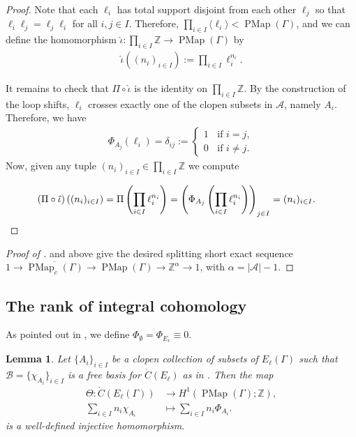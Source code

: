 \documentclass[11pt]{amsart}
\theoremstyle{plain}
\newtheorem{LEM}[THM]{Lemma}
\theoremstyle{definition}
\DeclareMathOperator{\PMap}{PMap}
\newcommand{\Z}{\mathbb{Z}}
\newcommand{\cA}{\mathcal{A}}
\def\G{{\Gamma}}
\newcommand{\la}{\langle}
\newcommand{\ra}{\rangle}
\newcommand{\<}{\langle}
\renewcommand{\>}{\rangle}
\newcommand{\dC}{\mathring{C}}
\begin{document}
\begin{proof}
    Note that each $\ell_{i}$ has total support disjoint from each other $\ell_{j}$ so that $\ell_{i}\ell_{j} = \ell_{j}\ell_{i}$ for all $i,j \in I$. Therefore, $\prod_{i \in I} \la \ell_{i} \ra < \PMap(\G)$, and we can define the homomorphism $\hat{\iota}: \prod_{i \in I}\mathbb{Z} \to \PMap(\G)$ by 
    \begin{align*}
        \hat{\iota}\left((n_{i})_{i\in I}\right) := \prod_{i\in I} \ell_{i}^{n_{i}}.
    \end{align*}
    
    
    It remains to check that $\Pi \circ \hat{\iota}$ is the identity on $\prod_{i\in I}\Z$. By the construction of the loop shifts, $\ell_{i}$ crosses exactly one of the clopen subsets in $\cA$, namely $A_{i}$. Therefore, we have
    \begin{align*}
        \Phi_{A_{j}} (\ell_{i}) = \delta_{ij}:=\begin{cases} 1 \;\; \text{ if } i=j, \\ 0 \;\; \text{ if } i\neq j.\end{cases}
    \end{align*}
    Now, given any tuple $(n_{i})_{i \in I} \in \prod_{i\in I}\Z$ we compute

        \begin{align*}
        (\Pi \circ \hat{\iota})\left((n_{i})_{i\in I}\right) &= \Pi\left(\prod_{i\in I} \ell_{i}^{n_{i}}\right) = \left(\Phi_{A_{j}}\left(\prod_{i\in I} \ell_{i}^{n_{i}}\right)\right)_{j\in I} = (n_{i})_{i\in I}. \qedhere
    \end{align*}  
\end{proof}

\begin{proof}[Proof of ]
     and  above give the desired splitting short exact sequence $1 \longrightarrow \overline{\PMap_c(\G)} \longrightarrow \PMap(\G) \longrightarrow \Z^\alpha \longrightarrow 1$, with $\alpha = |\mathcal{A}|-1$.
\end{proof}


\subsection{The rank of integral cohomology}
\label{ssec:firstcohomology}

As pointed out in , we define $\Phi_{\emptyset} = \Phi_{E_\ell} \equiv 0$.

\begin{LEM}\label{lem:cech2FirstCohomology}
    Let $\{A_i\}_{i \in I}$ be a clopen collection of subsets of $E_\ell(\G)$ such that $\mathcal{B} = \{\chi_{A_i}\}_{i \in I}$ is a free basis for $\dC(E_\ell)$ as in .
    Then the map
    \begin{align*}
        \Theta: \dC(E_\ell(\G)) &\longrightarrow H^1(\PMap(\G);\Z), \\
        \sum_{i \in I}{n_i}\chi_{A_i} &\longmapsto \sum_{i \in I}{n_i}\Phi_{A_i}.
    \end{align*}
    is a well-defined injective homomorphism.
\end{LEM}
\end{document}
